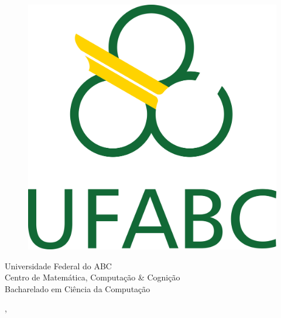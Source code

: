   \begin{capa}%
    \begin{figure}[h!]%
        \centering%
        \includegraphics[scale=1.2]{figs/logo.png}%
      \end{figure}%
    \center
	\ABNTEXchapterfont\large{Universidade Federal do ABC \\ Centro de Matemática, Computação \& Cognição \\ Bacharelado em Ciência da Computação}

    \vfill
    \ABNTEXchapterfont\bfseries\LARGE\imprimirtitulo
    \vfill

	\ABNTEXchapterfont\large\imprimirautor
	\vfill
%
	
	
    \large\imprimirlocal, \large\imprimirdata

    \vspace*{1cm}
  \end{capa}
